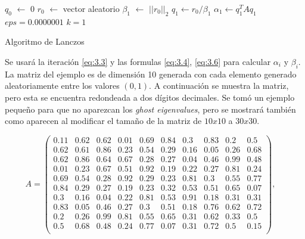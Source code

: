 \begin{algorithm}[H] 
 $q_0$ $\leftarrow$ $0$\;
 $r_0$ $\leftarrow$ vector aleatorio\;
 $\beta_1$ $\leftarrow$ $||r_0||_2$\;
 $q_1 \leftarrow r_0 / \beta_1$\;
 $\alpha_1 \leftarrow q_1^T A q_1$\;
 $eps = 0.0000001$\;
 $k = 1$ \;
 \caption{Algoritmo de Lanczos}
\end{algorithm}

\begin{example}
Se usará la iteración \ref{eq:3.3} y las formulas \ref{eq:3.4}, \ref{eq:3.6} para calcular $\alpha_i$ y $\beta_i$. La matriz del ejemplo es de dimensión 10 generada con cada elemento generado aleatoriamente entre los valores $(0,1)$. A continuación se muestra la matriz, pero esta se encuentra redondeada a dos dígitos decimales. Se tomó un ejemplo pequeño para que no aparezcan los \textit{ghost eigenvalues}, pero se mostrará también como aparecen al modificar el tamaño de la matriz de $10x10$ a $30x30$.

\begin{equation*}
A = \left(\!
    \begin{array}{cccccccccc}
0.11 & 0.62 & 0.62 & 0.01 & 0.69 & 0.84 & 0.3 & 0.83 & 0.2 & 0.5 \\
0.62 & 0.61 & 0.86 & 0.23 & 0.54 & 0.29 & 0.16 & 0.05 & 0.26 & 0.68 \\
0.62 & 0.86 & 0.64 & 0.67 & 0.28 & 0.27 & 0.04 & 0.46 & 0.99 & 0.48 \\
0.01 & 0.23 & 0.67 & 0.51 & 0.92 & 0.19 & 0.22 & 0.27 & 0.81 & 0.24 \\
0.69 & 0.54 & 0.28 & 0.92 & 0.29 & 0.23 & 0.81 & 0.3 & 0.55 & 0.77 \\
0.84 & 0.29 & 0.27 & 0.19 & 0.23 & 0.32 & 0.53 & 0.51 & 0.65 & 0.07\\
0.3 & 0.16 & 0.04 & 0.22 & 0.81 & 0.53 & 0.91 & 0.18 & 0.31 & 0.31\\
0.83 & 0.05 & 0.46 & 0.27 & 0.3 & 0.51 & 0.18 & 0.76 & 0.62 & 0.72\\
0.2 & 0.26 & 0.99 & 0.81 & 0.55 & 0.65 & 0.31 & 0.62 & 0.33 & 0.5\\
0.5 & 0.68 & 0.48 & 0.24 & 0.77 & 0.07 & 0.31 & 0.72 & 0.5 & 0.15\\
\end{array}
  \!\right), \quad
\end{equation*}


\end{example}
